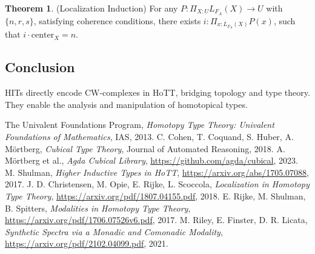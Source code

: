 \documentclass{article}
\theoremstyle{definition}
\newtheorem{theorem}{Theorem}
\begin{document}
\begin{theorem} (Localization Induction)
For any \( P : \Pi_{X:U} L_{F_A}(X) \to U \) with \( \{n, r, s\} \), satisfying coherence conditions,
there exists \( i : \Pi_{x:L_{F_A}(X)} P(x) \), such that \( i \cdot \text{center}_X = n \).
\end{theorem}

\subsection*{Conclusion}
HITs directly encode CW-complexes in HoTT, bridging topology and type theory.
They enable the analysis and manipulation of homotopical types.

\newpage

\begin{thebibliography}{9}
The Univalent Foundations Program, \emph{Homotopy Type Theory: Univalent Foundations of Mathematics}, IAS, 2013.
C. Cohen, T. Coquand, S. Huber, A. Mörtberg, \emph{Cubical Type Theory}, Journal of Automated Reasoning, 2018.
A. Mörtberg et al., \emph{Agda Cubical Library}, \url{https://github.com/agda/cubical}, 2023.
M. Shulman, \emph{Higher Inductive Types in HoTT}, \url{https://arxiv.org/abs/1705.07088}, 2017.
J. D. Christensen, M. Opie, E. Rijke, L. Scoccola, \emph{Localization in Homotopy Type Theory}, \url{https://arxiv.org/pdf/1807.04155.pdf}, 2018.
E. Rijke, M. Shulman, B. Spitters, \emph{Modalities in Homotopy Type Theory}, \url{https://arxiv.org/pdf/1706.07526v6.pdf}, 2017.
M. Riley, E. Finster, D. R. Licata, \emph{Synthetic Spectra via a Monadic and Comonadic Modality}, \url{https://arxiv.org/pdf/2102.04099.pdf}, 2021.
\end{thebibliography}
\end{document}
